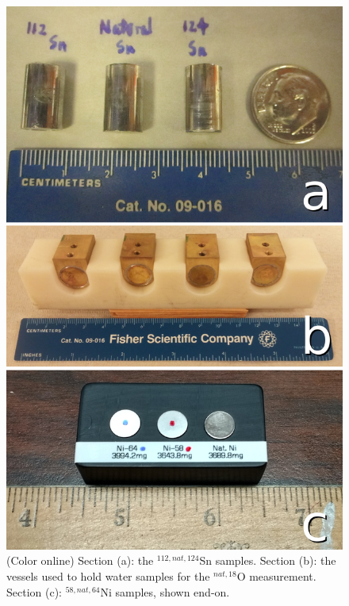 \begin{figure}
    \includegraphics[scale=0.23]{figures/AllIsotopicSamples.jpg}
    \caption{(Color online) Section (a): the ${^{112,nat,124}}$Sn samples. Section (b): the 
        vessels used to hold water samples for the ${^{nat, 18}}$O \tots measurement. 
        Section (c): ${^{58,nat,64}}$Ni samples, shown end-on.}
    \label{SamplesImage}
\end{figure}




